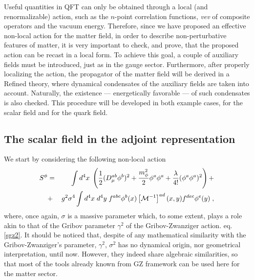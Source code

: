 Useful quantities in QFT can only be obtained through a local (and renormalizable) action, such
as the $n$-point correlation functions, \emph{vev} of composite operators and the vacuum
energy. Therefore, since we have proposed an effective non-local action for the matter field,
in order to describe non-perturbative features of matter, it is very important to check, and
prove, that the proposed action can be recast in a local form. To achieve this goal, a couple
of auxiliary fields must be introduced, just as in the gauge sector. Furthermore, after
properly localizing the action, the propagator of the matter field will be derived in a Refined
theory, where dynamical condensates of the auxiliary fields are taken into account. Naturally,
the existence --- energetically favorable --- of such condensates is also checked. This
procedure will be developed in both example cases, for the scalar field and for the quark
field.










\subsection{The scalar field in the adjoint representation } 

We start by considering the following non-local action  
\begin{eqnarray}
\label{acs}
S^{\phi} &=& \int d^4x\; \left(
 \frac{1}{2}(D^{ab}_{\mu}\phi^{b})^{2} + \frac{m^2_{\phi}}{2} \phi^a \phi^a 
+ \frac{\lambda}{4!}(\phi^{a}\phi^{a})^{2} \right)   + 
\nonumber \\
&+&
{g^{2}} \sigma^4  \int d^{4}x\;d^{4}y\;
f^{abc}\phi^{b}(x)\left[ {\cal M}^{-1}\right]^{ad} (x,y)f^{dec}\phi^{e}(y) \;, 
\end{eqnarray}
where, once again, $\sigma$ is a massive parameter which, to some extent, plays a role akin to that of the
Gribov parameter $\gamma^2$ of the Gribov-Zwanziger action. eq.\eqref{sgz2}. It should be
noticed that, despite of any mathematical similarity with the Gribov-Zwanziger's parameter,
$\gamma^{2}$, $\sigma^{2}$ has no dynamical origin, nor geometrical interpretation, until now.
However, they indeed share algebraic similarities, so that
most of the tools already known from GZ framework can be used here for the matter sector.

